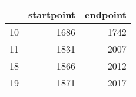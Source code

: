 % 
\begin{tabular}{rrr}
  \hline
 & startpoint & endpoint \\ 
  \hline
10 & 1686 & 1742 \\ 
  11 & 1831 & 2007 \\ 
  18 & 1866 & 2012 \\ 
  19 & 1871 & 2017 \\ 
   \hline
\end{tabular}
